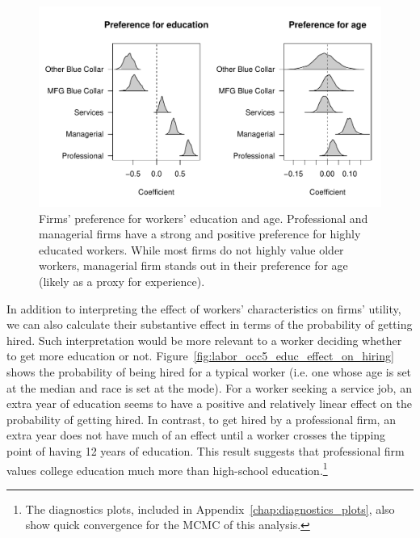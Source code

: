 \begin{figure}[tbp]
  \centering
  \includegraphics[width=\textwidth,keepaspectratio]{../figure/labor_occ5_beta_educ_age}
  \caption[Firms' preference in the US labor market]{Firms' preference for workers' education and
    age. Professional and managerial firms have a strong and positive preference
  for highly educated workers. While most firms do not highly value older workers,
  managerial firm stands out in their preference for age (likely as a
  proxy for experience).}
  \label{fig:labor_occ5_beta_educ_age}
\end{figure}

In addition to interpreting the effect of workers' characteristics on firms'
utility, we can also calculate their substantive effect in terms of the
probability of getting hired. Such interpretation would be more relevant to a
worker deciding whether to get more education or not.
Figure~\ref{fig:labor_occ5_educ_effect_on_hiring} shows the probability of being
hired for a typical worker (i.e. one whose age is set at the median and race is
set at the mode). For a worker seeking a service job, an extra year of education
seems to have a positive and relatively linear effect on the probability of
getting hired. In contrast, to get hired by a professional firm, an extra year
does not have much of an effect until a worker crosses the tipping point of
having 12 years of education. This result suggests that professional firm values
college education much more than high-school education.\footnote{The diagnostics
  plots, included in Appendix~\ref{chap:diagnostics_plots}, also show quick
  convergence for the MCMC of this analysis.}

